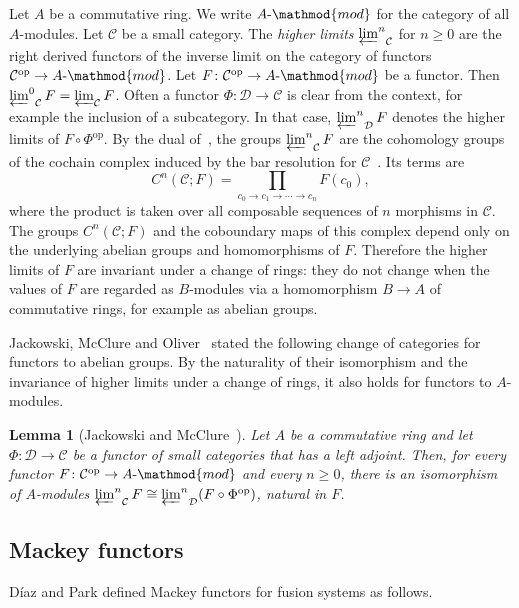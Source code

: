 \documentclass[10pt]{amsart}
\newtheorem{lemma}[theorem]{Lemma}
\theoremstyle{definition}
\numberwithin{equation}{section}
\renewcommand{\ge}{\geqslant}
\newcommand{\limi}[2]{\mathop{\varprojlim\nolimits^{#1}}_{#2}}
\begin{document}
Let $A$ be a commutative ring. We write $A\text{-}\mathmod{mod}$ for the category of all $A$-modules. Let $\mathcal C$ be a small category. The \emph{higher limits} $\limi{n}{\mathcal C}$ for $n\ge0$ are the right derived functors of the inverse limit on the category of functors $\mathcal C^{\mathrm{op}}\to A\text{-}\mathmod{mod}$. Let $F\colon\mathcal C^{\mathrm{op}}\to A\text{-}\mathmod{mod}$ be a functor. Then $\limi{0}{\mathcal C}F=\varprojlim_{\mathcal C}F$. Often a functor $\Phi\colon\mathcal D\to\mathcal C$ is clear from the context, for example the inclusion of a subcategory. In that case, $\limi{n}{\mathcal D}F$ denotes the higher limits of $F\circ\Phi^{\mathrm{op}}$. By the dual of~\cite[Appendix~II, Proposition~3.3]{GZ1967}, the groups $\limi{n}{\mathcal C}F$ are the cohomology groups of the cochain complex induced by the bar resolution for $\mathcal C$~\cite[\S III.5.1]{AKO}. Its terms are
\begin{equation}\label{eq:cochains}
C^n(\mathcal C;F)=\prod_{c_0\to c_1\to\cdots\to c_n}F(c_0),
\end{equation}
where the product is taken over all composable sequences of $n$ morphisms in $\mathcal C$. The groups $C^n(\mathcal C;F)$ and the coboundary maps of this complex depend only on the underlying abelian groups and homomorphisms of $F$. Therefore the higher limits of $F$ are invariant under a change of rings: they do not change when the values of $F$ are regarded as $B$-modules via a homomorphism $B\to A$ of commutative rings, for example as abelian groups.

Jackowski, McClure and Oliver~\cite[Proposition~5.1(ii)]{JMO1992II} stated the following change of categories for functors to abelian groups. By the naturality of their isomorphism and the invariance of higher limits under a change of rings, it also holds for functors to $A$-modules.

\begin{lemma}[{Jackowski and McClure~\cite[Lemma~3.1]{JM1992}}]\label{lem:change}
Let $A$ be a commutative ring and let ${\Phi\colon\mathcal D\to\mathcal C}$ be a functor of small categories that has a left adjoint. Then, for every functor ${F\colon\mathcal C^{\mathrm{op}}\to A\text{-}\mathmod{mod}}$ and every $n\ge0$, there is an isomorphism of $A$-modules ${\limi{n}{\mathcal C}F\cong\limi{n}{\mathcal D}(F\circ\Phi^{\mathrm{op}})}$, natural in $F$.
\end{lemma}

\subsection{Mackey functors}\label{subsec:mackey}
D\'iaz and Park defined Mackey functors for fusion systems as follows.
\end{document}

